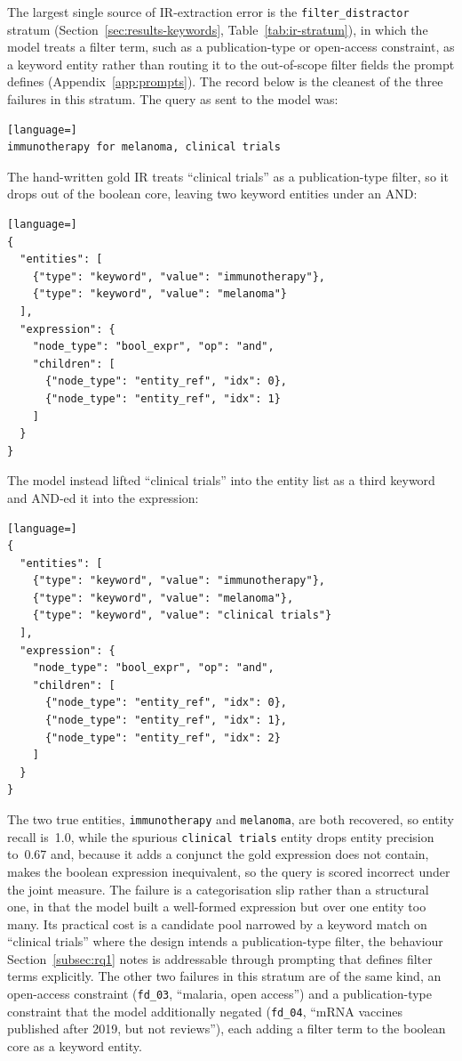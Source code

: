 The largest single source of IR-extraction error is the
\lstinline|filter_distractor| stratum (Section~\ref{sec:results-keywords},
Table~\ref{tab:ir-stratum}), in which the model treats a filter term, such as a
publication-type or open-access constraint, as a keyword entity rather than
routing it to the out-of-scope filter fields the prompt defines
(Appendix~\ref{app:prompts}). The record below is the cleanest of the three
failures in this stratum. The query as sent to the model was:

\begin{lstlisting}[language=]
immunotherapy for melanoma, clinical trials
\end{lstlisting}

\noindent The hand-written gold IR treats ``clinical trials'' as a
publication-type filter, so it drops out of the boolean core, leaving two keyword
entities under an AND:

\begin{lstlisting}[language=]
{
  "entities": [
    {"type": "keyword", "value": "immunotherapy"},
    {"type": "keyword", "value": "melanoma"}
  ],
  "expression": {
    "node_type": "bool_expr", "op": "and",
    "children": [
      {"node_type": "entity_ref", "idx": 0},
      {"node_type": "entity_ref", "idx": 1}
    ]
  }
}
\end{lstlisting}

\noindent The model instead lifted ``clinical trials'' into the entity list as a
third keyword and AND-ed it into the expression:

\begin{lstlisting}[language=]
{
  "entities": [
    {"type": "keyword", "value": "immunotherapy"},
    {"type": "keyword", "value": "melanoma"},
    {"type": "keyword", "value": "clinical trials"}
  ],
  "expression": {
    "node_type": "bool_expr", "op": "and",
    "children": [
      {"node_type": "entity_ref", "idx": 0},
      {"node_type": "entity_ref", "idx": 1},
      {"node_type": "entity_ref", "idx": 2}
    ]
  }
}
\end{lstlisting}

\noindent The two true entities, \lstinline|immunotherapy| and
\lstinline|melanoma|, are both recovered, so entity recall is~1.0, while the
spurious \lstinline|clinical trials| entity drops entity precision to~0.67 and,
because it adds a conjunct the gold expression does not contain, makes the boolean
expression inequivalent, so the query is scored incorrect under the joint measure.
The failure is a categorisation slip rather than a structural one, in that the
model built a well-formed expression but over one entity too many. Its practical
cost is a candidate pool narrowed by a keyword match on ``clinical trials'' where
the design intends a publication-type filter, the behaviour
Section~\ref{subsec:rq1} notes is addressable through prompting that defines filter
terms explicitly. The other two failures in this stratum are of the same kind, an
open-access constraint (\lstinline|fd_03|, ``malaria, open access'') and a
publication-type constraint that the model additionally negated (\lstinline|fd_04|,
``mRNA vaccines published after 2019, but not reviews''), each adding a filter term
to the boolean core as a keyword entity.